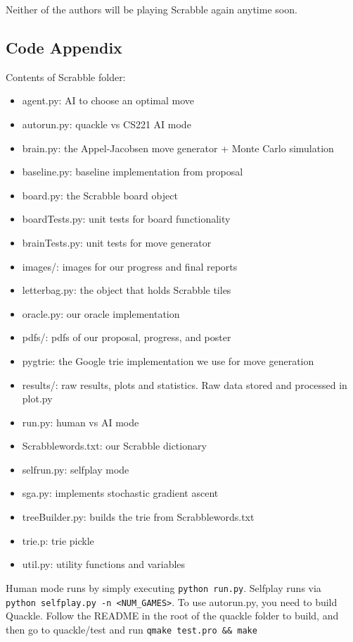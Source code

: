 \documentclass[12pt]{article}
\begin{document}
Neither of the authors will be playing Scrabble again anytime soon.

\clearpage
\begin{center}
 \section*{Code Appendix}
\end{center}
Contents of Scrabble folder:
\begin{itemize}
\setlength\itemsep{-0.22em}
\item agent.py: AI to choose an optimal move
\item autorun.py: quackle vs CS221 AI mode
\item brain.py: the Appel-Jacobsen move generator + Monte Carlo simulation
\item baseline.py: baseline implementation from proposal
\item board.py: the Scrabble board object 
\item boardTests.py: unit tests for board functionality
\item brainTests.py: unit tests for move generator
\item images/: images for our progress and final reports
\item letterbag.py: the object that holds Scrabble tiles
\item oracle.py: our oracle implementation
\item pdfs/: pdfs of our proposal, progress, and poster
\item pygtrie: the Google trie implementation we use for move generation
\item results/: raw results, plots and statistics. Raw data stored and processed in plot.py
\item run.py: human vs AI mode
\item Scrabblewords.txt: our Scrabble dictionary
\item selfrun.py: selfplay mode
\item sga.py: implements stochastic gradient ascent
\item treeBuilder.py: builds the trie from Scrabblewords.txt
\item trie.p: trie pickle
\item util.py: utility functions and variables
\end{itemize}

Human mode runs by simply executing \verb|python run.py|. Selfplay
runs via\\ \verb|python selfplay.py -n <NUM_GAMES>|. To use
autorun.py, you need to build Quackle. Follow the README in the root
of the quackle folder to build, and then go to quackle/test and
run \verb|qmake test.pro && make|
\end{document}

